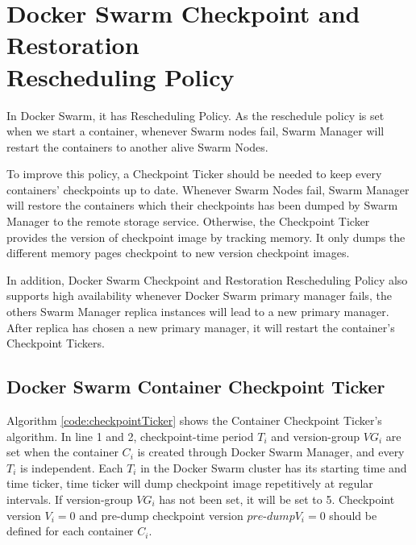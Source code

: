 \section{Docker Swarm Checkpoint and Restoration \\Rescheduling Policy}
\label{sec:checkpoint restore rescheduling policy}
In Docker Swarm, it has Rescheduling Policy. As the reschedule policy is set when we start a container, whenever Swarm nodes fail, Swarm Manager will restart the containers to another alive Swarm Nodes.

To improve this policy, a Checkpoint Ticker should be needed to keep every containers' checkpoints up to date.
Whenever Swarm Nodes fail, Swarm Manager will restore the containers which their checkpoints has been dumped by Swarm Manager to the remote storage service.
Otherwise, the Checkpoint Ticker provides the version of checkpoint image by tracking memory. It only dumps the different memory pages checkpoint to new version checkpoint images.

In addition, Docker Swarm Checkpoint and Restoration Rescheduling Policy also supports high availability whenever Docker Swarm primary manager fails, the others Swarm Manager replica instances will lead to a new primary manager. After replica has chosen a new primary manager, it will restart the container's Checkpoint Tickers.

\subsection{Docker Swarm Container Checkpoint Ticker}
Algorithm \ref{code:checkpointTicker} shows the Container Checkpoint Ticker's algorithm.
In line 1 and 2, checkpoint-time period $T_i$ and version-group $VG_i$ are set when the container $C_i$ is created through Docker Swarm Manager, and every $T_i$ is independent.
Each $T_i$ in the Docker Swarm cluster has its starting time and time ticker, time ticker will dump checkpoint image repetitively at regular intervals. If version-group $VG_i$ has not been set, it will be set to 5.
Checkpoint version $V_i=0$ and pre-dump checkpoint version $pre$-$dump V_i=0$ should be defined for each container $C_i$.

